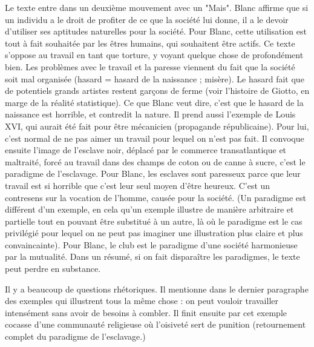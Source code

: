 \documentclass[a4paper,12pt]{book}
\begin{document}
\par Le texte entre dans un deuxième mouvement avec un "Mais". Blanc affirme que si un individu a le droit de profiter de ce que la société lui donne, il a le devoir d'utiliser ses aptitudes naturelles pour la société. Pour Blanc, cette utilisation est tout à fait souhaitée par les êtres humains, qui souhaitent être actifs. Ce texte s'oppose au travail en tant que torture, y voyant quelque chose de profondément bien. Les problèmes avec le travail et la paresse viennent du fait que la société soit mal organisée (hasard = hasard de la naissance ; misère). Le hasard fait que de potentiels grands artistes restent garçons de ferme (voir l'histoire de Giotto, en marge de la réalité statistique). Ce que Blanc veut dire, c'est que le hasard de la naissance est horrible, et contredit la nature. Il prend aussi l'exemple de Louis XVI, qui aurait été fait pour être mécanicien (propagande républicaine). Pour lui, c'est normal de ne pas aimer un travail pour lequel on n'est pas fait. Il convoque ensuite l'image de l'esclave noir, déplacé par le commerce transatlantique et maltraité, forcé au travail dans des champs de coton ou de canne à sucre, c'est le paradigme de l'esclavage. Pour Blanc, les esclaves sont paresseux parce que leur travail est si horrible que c'est leur seul moyen d'être heureux. C'est un contresens sur la vocation de l'homme, causée pour la société. (Un paradigme est différent d'un exemple, en cela qu'un exemple illustre de manière arbitraire et partielle tout en pouvant être substitué à un autre, là où le paradigme est le cas privilégié pour lequel on ne peut pas imaginer une illustration plus claire et plus convaincainte). Pour Blanc, le club est le paradigme d'une société harmonieuse par la mutualité. Dans un résumé, si on fait disparaître les paradigmes, le texte peut perdre en substance.
\par Il y a beaucoup de questions rhétoriques. Il mentionne dans le dernier paragraphe des exemples qui illustrent tous la même chose : on peut vouloir travailler intensément sans avoir de besoins à combler. Il finit ensuite par cet exemple cocasse d'une communauté religieuse où l'oisiveté sert de punition (retournement complet du paradigme de l'esclavage.)
\end{document}
